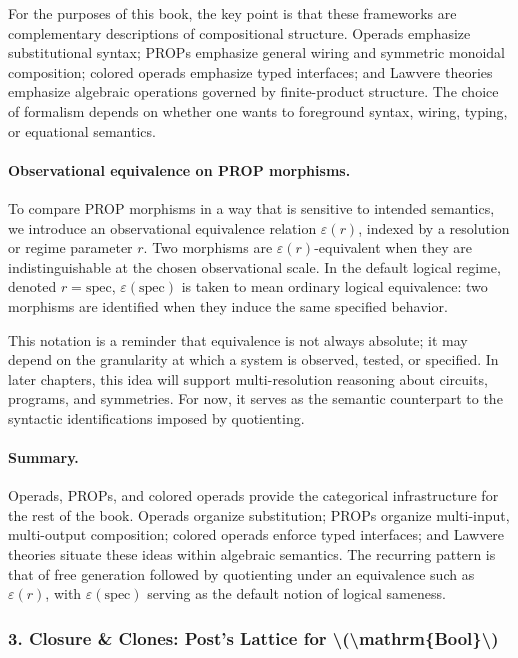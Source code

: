 \documentclass[11pt]{article}
\begin{document}
For the purposes of this book, the key point is that these frameworks are complementary descriptions of compositional structure. Operads emphasize substitutional syntax; PROPs emphasize general wiring and symmetric monoidal composition; colored operads emphasize typed interfaces; and Lawvere theories emphasize algebraic operations governed by finite-product structure. The choice of formalism depends on whether one wants to foreground syntax, wiring, typing, or equational semantics.

\paragraph{Observational equivalence on PROP morphisms.}
To compare PROP morphisms in a way that is sensitive to intended semantics, we introduce an observational equivalence relation \(\varepsilon(r)\), indexed by a resolution or regime parameter \(r\). Two morphisms are \(\varepsilon(r)\)-equivalent when they are indistinguishable at the chosen observational scale. In the default logical regime, denoted \(r = \mathrm{spec}\), \(\varepsilon(\mathrm{spec})\) is taken to mean ordinary logical equivalence: two morphisms are identified when they induce the same specified behavior.

This notation is a reminder that equivalence is not always absolute; it may depend on the granularity at which a system is observed, tested, or specified. In later chapters, this idea will support multi-resolution reasoning about circuits, programs, and symmetries. For now, it serves as the semantic counterpart to the syntactic identifications imposed by quotienting.

\paragraph{Summary.}
Operads, PROPs, and colored operads provide the categorical infrastructure for the rest of the book. Operads organize substitution; PROPs organize multi-input, multi-output composition; colored operads enforce typed interfaces; and Lawvere theories situate these ideas within algebraic semantics. The recurring pattern is that of free generation followed by quotienting under an equivalence such as \(\varepsilon(r)\), with \(\varepsilon(\mathrm{spec})\) serving as the default notion of logical sameness.



\subsubsection{3. Closure \& Clones: Post’s Lattice for \textbackslash{}(\textbackslash{}mathrm\{Bool\}\textbackslash{})}
\end{document}

